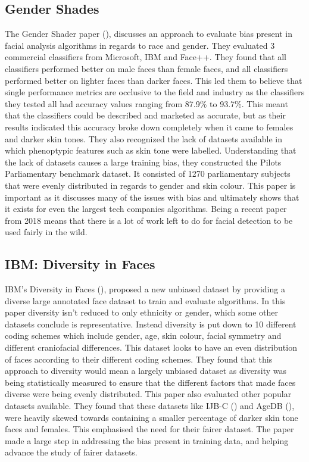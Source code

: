 \documentclass{l4proj}
\begin{document}
\subsection{Gender Shades}
The Gender Shader paper (\cite{gendershades}), discusses an approach to evaluate bias present in facial analysis algorithms in regards to race and gender. They evaluated 3 commercial classifiers from Microsoft, IBM and Face++. They found that all classifiers performed better on male faces than female faces, and all classifiers performed better on lighter faces than darker faces. This led them to believe that single performance metrics are occlusive to the field and industry as the classifiers they tested all had accuracy values ranging from 87.9\% to 93.7\%. This meant that the classifiers could be described and marketed as accurate, but as their results indicated this accuracy broke down completely when it came to females and darker skin tones. They also recognized the lack of datasets available in which phenoptypic features such as skin tone were labelled. Understanding that the lack of datasets causes a large training bias, they constructed the Pilots Parliamentary benchmark dataset. It consisted of 1270 parliamentary subjects that were evenly distributed in regards to gender and skin colour. This paper is important as it discusses many of the issues with bias and ultimately shows that it exists for even the largest tech companies algorithms. Being a recent paper from 2018 means that there is a lot of work left to do for facial detection to be used fairly in the wild.
\subsection{IBM: Diversity in Faces}
IBM's Diversity in Faces (\cite{dif}), proposed a new unbiased dataset by providing a diverse large annotated face dataset to train and evaluate algorithms. In this paper diversity isn't reduced to only ethnicity or gender, which some other datasets conclude is representative. Instead diversity is put down to 10 different coding schemes which include gender, age, skin colour, facial symmetry and different craniofacial differences. This dataset looks to have an even distribution of faces according to their different coding schemes. They found that this approach to diversity would mean a largely unbiased dataset as diversity was being statistically measured to ensure that the different factors that made faces diverse were being evenly distributed. This paper also evaluated other popular datasets available. They found that these datasets like IJB-C (\cite{ijb-c}) and AgeDB (\cite{agedb}), were heavily skewed towards containing a smaller percentage of darker skin tone faces and females. This emphasised the need for their fairer dataset. The paper made a large step in addressing the bias present in training data, and helping advance the study of fairer datasets.
\end{document}
